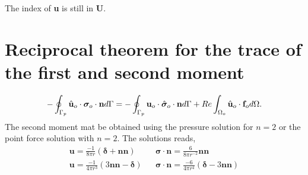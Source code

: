 The index of \textbf{u} is still in \textbf{U}. 
\section{Reciprocal theorem for the trace of the first and second moment}
\begin{equation}
    -\intS[p]{\hat{\textbf{u}}_{o} \cdot  \bm\sigma_{o}\cdot \textbf{n}}
    =
    -\intS[p]{\textbf{u}_{o} \cdot \hat{\bm\sigma}_{o}\cdot \textbf{n}}
    + 
    Re\intO[o]{\hat{\textbf{u}}_{o}\cdot \textbf{f}_{o}}.
    \label{eq:int_first_step}
\end{equation}
The second moment mat be obtained using the pressure solution for $n=2$ or the point force solution with $n=2$. 
The solutions reads, 
\begin{align}
    \textbf{u} = \frac{-1}{8\pi r}(\bm\delta + \textbf{nn})
    && \bm\sigma\cdot \textbf{n} = \frac{6}{8\pi r^{-2}}\textbf{nn}\\
    \textbf{u} = \frac{-1}{4\pi r^3}(3\textbf{nn}- \bm\delta)
    && \bm\sigma\cdot \textbf{n} = \frac{- 6}{4\pi r^4} (\bm\delta - 3\textbf{nn})\\
\end{align}


